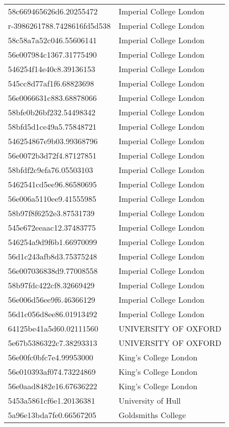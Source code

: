 \begin{tabular}{ll}
58c669465626d6.20255472 & Imperial College London \\
r-3986261788.7428616fd5d538 & Imperial College London \\
58c58a7a52c046.55606141 & Imperial College London \\
56e007984c1367.31775490 & Imperial College London \\
546254f14e40c8.39136153 & Imperial College London \\
545cc8d77af1f6.68823698 & Imperial College London \\
56e0066631c883.68878066 & Imperial College London \\
58bfe0b26bf232.54498342 & Imperial College London \\
58bfd5d1ce49a5.75848721 & Imperial College London \\
546254867e9b03.99368796 & Imperial College London \\
56e0072b3d72f4.87127851 & Imperial College London \\
58bfdf2c9efa76.05503103 & Imperial College London \\
5462541cd5ee96.86580695 & Imperial College London \\
56e006a5110ee9.41555985 & Imperial College London \\
58b97f8f6252e3.87531739 & Imperial College London \\
545e672eeaac12.37483775 & Imperial College London \\
546254a9d9f6b1.66970099 & Imperial College London \\
56d1c243afb8d3.75375248 & Imperial College London \\
56e007036838d9.77008558 & Imperial College London \\
58b97fdc422cf8.32669429 & Imperial College London \\
56e006d56ee9f6.46366129 & Imperial College London \\
56d1c056d8ee86.01913492 & Imperial College London \\
64125be41a5d60.02111560 & UNIVERSITY OF OXFORD \\
5e67b5386322c7.38293313 & UNIVERSITY OF OXFORD \\
56e00fc0bfc7e4.99953000 & King's College London \\
56e010393af074.73224869 & King's College London \\
56e0aad8482e16.67636222 & King's College London \\
5453a5861cf6e1.20136381 & University of Hull \\
5a96e13bda7fe0.66567205 & Goldsmiths College \\

\end{tabular}
